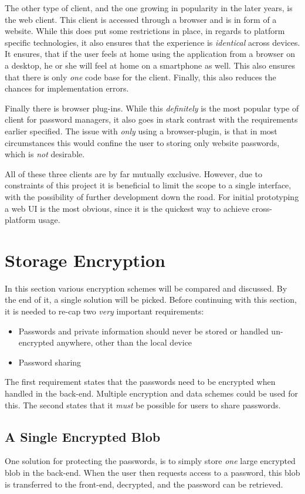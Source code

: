 		The other type of client, and the one growing in popularity in the later years, is the web client. This client is accessed through a browser and is in form of a website. While this does put some restrictions in place, in regards to platform specific technologies, it also ensures that the experience is \emph{identical} across devices. It ensures, that if the user feels at home using the application from a browser on a desktop, he or she will feel at home on a smartphone as well. This also ensures that there is only \emph{one} code base for the client. Finally, this also reduces the chances for implementation errors.

		Finally there is browser plug-ins. While this \emph{definitely} is the most popular type of client for password managers, it also goes in stark contrast with the requirements earlier specified. The issue with \emph{only} using a browser-plugin, is that in most circumstances this would confine the user to storing only website passwords, which is \emph{not} desirable.

		All of these three clients are by far mutually exclusive. However, due to constraints of this project it is beneficial to limit the scope to a single interface, with the possibility of further development down the road. For initial prototyping a web UI is the most obvious, since it is the quickest way to achieve cross-platform usage. 

	\section{Storage Encryption}
		In this section various encryption schemes will be compared and discussed. By the end of it, a single solution will be picked. Before continuing with this section, it is needed to re-cap two \emph{very} important requirements:
		\begin{itemize}
			\item Passwords and private information should never be stored or handled un-encrypted anywhere, other than the local device
			\item Password sharing
		\end{itemize}

		The first requirement states that the passwords need to be encrypted when handled in the back-end. Multiple encryption and data schemes could be used for this. The second states that it \emph{must} be possible for users to share passwords.

		\subsection{A Single Encrypted Blob}
			One solution for protecting the passwords, is to simply store \emph{one} large encrypted blob in the back-end. When the user then requests access to a password, this blob is transferred to the front-end, decrypted, and the password can be retrieved. 

